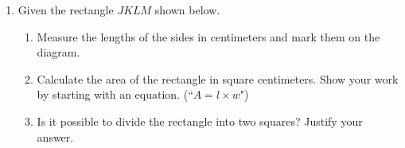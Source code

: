 \documentclass[12pt, twoside]{article}
\begin{document}
\begin{enumerate}
\item Given the rectangle $JKLM$ shown below.
    \begin{enumerate}
      \item Measure the lengths of the sides in centimeters and mark them on the diagram.
      \item Calculate the area of the rectangle in square centimeters. Show your work by starting with an equation. (``$A=l \times w$")
      \vspace{2cm}
      \item Is it possible to divide the rectangle into two squares? Justify your answer.
    \end{enumerate}
    \vspace{2cm}
    \begin{center}
    \end{center}

\end{enumerate}
\end{document}
